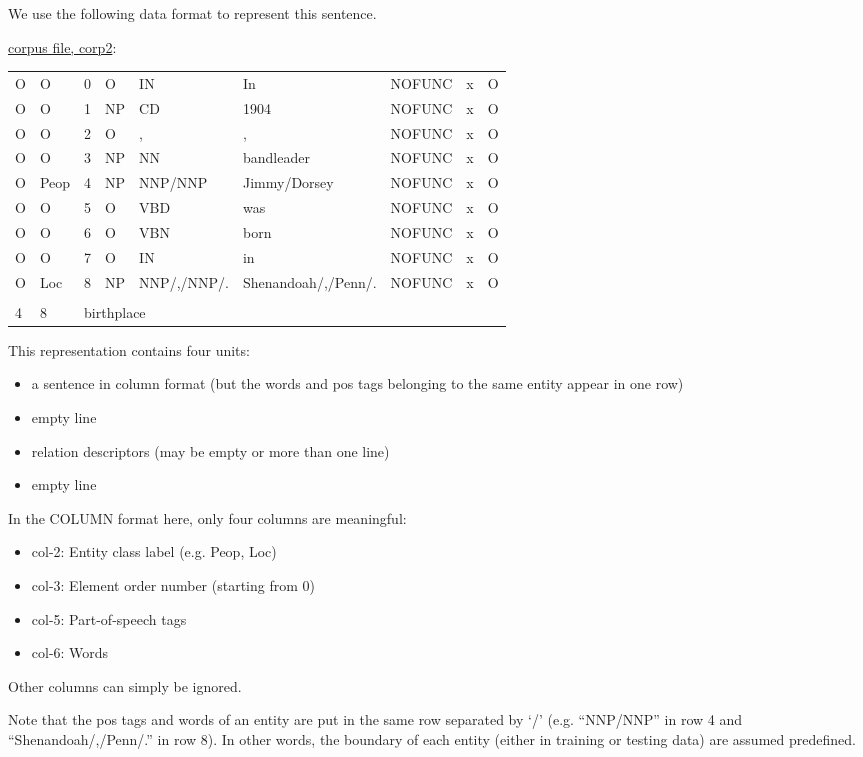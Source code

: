 \documentclass[11pt]{article}
\begin{document}
We use the following data format to represent this sentence.

\underline{corpus file, corp2}: 
\begin{center}
\begin{tabular}{@{}lllllllll}
O & O & 0 & O & IN & In & NOFUNC & x & O \\
O & O & 1 & NP & CD & 1904 & NOFUNC & x & O \\
O & O & 2 & O & , & , & NOFUNC & x & O \\
O & O & 3 & NP & NN & bandleader & NOFUNC & x & O \\
O & Peop & 4 & NP & NNP/NNP & Jimmy/Dorsey & NOFUNC & x & O \\
O & O & 5 & O & VBD & was & NOFUNC & x & O \\
O & O & 6 & O & VBN & born & NOFUNC & x & O \\
O & O & 7 & O & IN & in & NOFUNC & x & O \\
O & Loc & 8 & NP & NNP/,/NNP/. & Shenandoah/,/Penn/. & NOFUNC & x & O \\
\\
4 & 8 & \multicolumn{5}{l}{birthplace} \\
\end{tabular}
\end{center}

This representation contains four units:
\begin{itemize}
  \item a sentence in column format (but the words and pos tags belonging to the same entity appear in one row)
  \item empty line
  \item relation descriptors (may be empty or more than one line)
  \item empty line
\end{itemize}

In the COLUMN format here, only four columns are meaningful:
\begin{itemize}
  \item col-2: Entity class label (e.g. Peop, Loc)
  \item col-3: Element order number (starting from 0)
  \item col-5: Part-of-speech tags
  \item col-6: Words 
\end{itemize}
Other columns can simply be ignored.

Note that the pos tags and words of an entity are put 
in the same row separated by `/' (e.g. ``NNP/NNP'' in row 4 and
``Shenandoah/,/Penn/.'' in row 8).  In other words, the boundary of each
entity (either in training or testing data) are assumed predefined.
\end{document}

